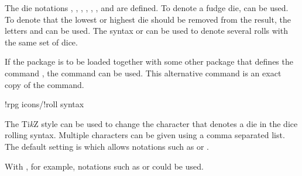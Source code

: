 \documentclass[a4paper]{article}
\begin{document}
The die notations , , , , , ,  and  are defined. To denote a fudge die,  can be used. To denote that the lowest or highest die should be removed from the result, the letters  and  can be used. The syntax  or  can be used to denote several rolls with the same set of dice.

If the  package is to be loaded together with some other package that defines the command \macro{\roll}, the command \macro{\rpgiconsroll} can be used. This alternative command is an exact copy of the \macro{\roll} command. 

\begin{macrodef}
!rpg icons/!roll syntax
\end{macrodef}
The Ti\emph{k}Z style  can be used to change the character that denotes a die in the dice rolling syntax. Multiple characters can be given using a comma separated list. The default setting is  which allows notations such as  or . 

With , for example, notations such as  or  could be used. 


\printchanges
\end{document}
